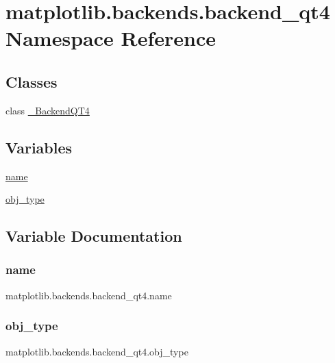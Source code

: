 \hypertarget{namespacematplotlib_1_1backends_1_1backend__qt4}{}\section{matplotlib.\+backends.\+backend\+\_\+qt4 Namespace Reference}
\label{namespacematplotlib_1_1backends_1_1backend__qt4}
\subsection*{Classes}
\begin{DoxyCompactItemize}
\item 
class \hyperlink{classmatplotlib_1_1backends_1_1backend__qt4_1_1__BackendQT4}{\+\_\+\+Backend\+Q\+T4}
\end{DoxyCompactItemize}
\subsection*{Variables}
\begin{DoxyCompactItemize}
\item 
\hyperlink{namespacematplotlib_1_1backends_1_1backend__qt4_a85f3e19786688904313b81ba09a24e00}{name}
\item 
\hyperlink{namespacematplotlib_1_1backends_1_1backend__qt4_aae755fb8b80ed15bf523a9351cb2a9fe}{obj\+\_\+type}
\end{DoxyCompactItemize}


\subsection{Variable Documentation}
\mbox{\label{namespacematplotlib_1_1backends_1_1backend__qt4_a85f3e19786688904313b81ba09a24e00}} 
\subsubsection{\texorpdfstring{name}{name}}
{\footnotesize\ttfamily matplotlib.\+backends.\+backend\+\_\+qt4.\+name}

\mbox{\label{namespacematplotlib_1_1backends_1_1backend__qt4_aae755fb8b80ed15bf523a9351cb2a9fe}} 
\subsubsection{\texorpdfstring{obj\+\_\+type}{obj\_type}}
{\footnotesize\ttfamily matplotlib.\+backends.\+backend\+\_\+qt4.\+obj\+\_\+type}


